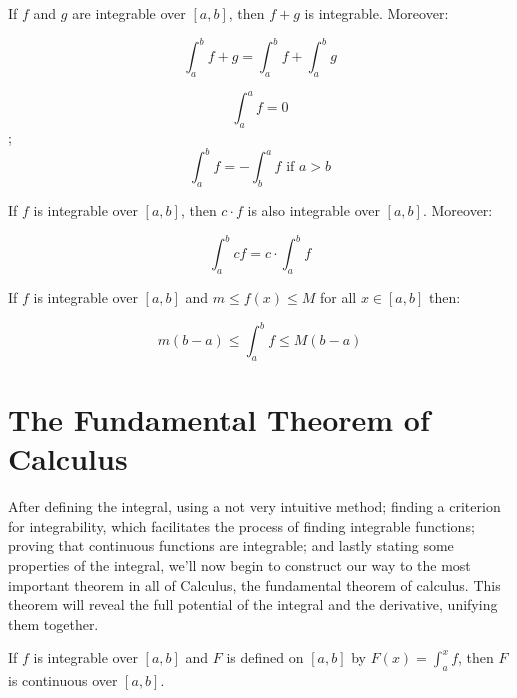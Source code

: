 \documentclass{report}
\begin{document}
    \begin{thBox}
        If $f$ and $g$ are integrable over $[a,b]$, then $f+g$ is integrable. Moreover:

        $$\int_{a}^{b}f+g = \int_{a}^{b}f + \int_{a}^{b}g$$
    \end{thBox}

    \begin{defBox}
        $$\int_{a}^{a}f = 0$$;
        $$\int_{a}^{b}f = - \int_{b}^{a}f \text{ if } a> b$$
    \end{defBox}

    \begin{thBox}
        If $f$ is integrable over $[a,b]$, then $c\cdot f$ is also integrable over $[a,b]$. Moreover:

        $$\int_{a}^{b}cf = c\cdot \int_{a}^{b}f$$
    \end{thBox}

    \begin{thBox}
        If $f$ is integrable over $[a,b]$ and $m\leq f(x) \leq M$ for all $x \in [a,b]$ then:

        $$m(b-a) \leq \int_{a}^{b}f \leq M(b-a)$$
    \end{thBox}


    \section{The Fundamental Theorem of Calculus}

    After defining the integral, using a not very intuitive method; finding a criterion for integrability, which facilitates the process of finding integrable functions; proving that continuous functions are integrable; and lastly stating some properties of the integral, we'll now begin to construct our way to the most important theorem in all of Calculus, the fundamental theorem of calculus. This theorem will reveal the full potential of the integral and the derivative, unifying them together.

    \begin{thBox}
        If $f$ is integrable over $[a,b]$ and $F$ is defined on $[a,b]$ by $F(x) = \int_{a}^{x}f$, then $F$ is continuous over $[a,b]$.
    \end{thBox}

\end{document}
